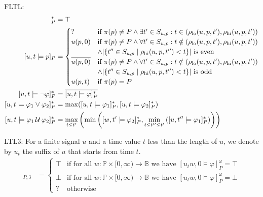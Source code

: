 \documentclass[envcountsame, runningheads]{llncs}
\newcommand{\B}{\mathbb{B}}
\def\until{\,\mathcal{U}\,}
\def\since{\,\mathcal{S}\,}
\newcommand{\?}{\text{?}}
\newcommand{\suchthat}{\;\ifnum\currentgrouptype=16 \middle\fi|\;}
\let\st\suchthat
\begin{document}
	FLTL:
	\begin{align*}
		[u,t \models \texttt{true}]_P^* &= \top \\
		[u,t \models p]_P &= \begin{cases}
			? &\text{if } \pi(p) \not = P \land \exists t' \in S_{u,p} : t \in (\rho_{\text{lo}}(u, p, t'), \rho_{\text{hi}}(u, p, t')) \\
			u(p,0) &\text{if } \pi(p) \not = P \land \forall t' \in S_{u,p} : t \notin (\rho_{\text{lo}}(u, p, t'), \rho_{\text{hi}}(u, p, t')) \\
			&\land |\{t'' \in S_{u,p} \st \rho_{\text{hi}}(u, p, t'') < t\}| \text{ is even} \\
			\overline{u(p,0)} &\text{if } \pi(p) \not = P \land \forall t' \in S_{u,p} : t \notin (\rho_{\text{lo}}(u, p, t'), \rho_{\text{hi}}(u, p, t')) \\
			&\land |\{t'' \in S_{u,p} \st \rho_{\text{hi}}(u, p, t'') < t\}| \text{ is odd} \\
			u(p,t) &\text{if } \pi(p) = P \\
		\end{cases} \\
		[u,t \models \lnot \varphi]_P^* &= \overline{[u,t \models \varphi]_P^*}\\
		[u,t \models \varphi_1 \lor \varphi_2]_P^* &= \max([u,t \models \varphi_1]_P^*, [u,t \models \varphi_2]_P^*)\\
		[u,t \models \varphi_1 \until \varphi_2]_P^* &= \max_{t \leq t'} \left( \min \left( [w,t' \models \varphi_2]_P^*, \min_{t \leq t'' \leq t'} \left( [u,t'' \models \varphi_1]_P^* \right) \right) \right)\\
	\end{align*}
	
	LTL3: For a finite signal $u$ and a time value $t$ less than the length of $u$, we denote by $u_t$ the suffix of $u$ that starts from time $t$.
	\begin{align*}
		[u,t \models \varphi]_{P,3} &= \begin{cases}
			\top &\text{if for all }  w : \mathbb{P} \times [0, \infty) \to \B  \text{ we have } [u_t w, 0 \models \varphi]_P^\omega = \top \\
			\bot &\text{if for all }  w : \mathbb{P} \times [0, \infty) \to \B  \text{ we have } [u_t w, 0 \models \varphi]_P^\omega = \bot \\
			? &\text{otherwise}
		\end{cases}
	\end{align*}
	
\end{document}

